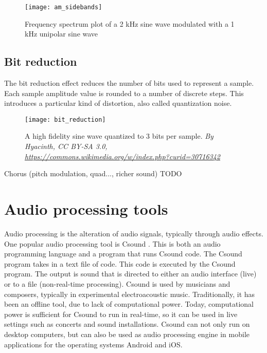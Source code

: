 \begin{figure}[h]
    \centering
    \texttt{[image: am\_sidebands]}
    \caption{Frequency spectrum plot of a 2 kHz sine wave modulated with a 1 kHz unipolar sine wave}
    \label{fig:am_sidebands}
\end{figure}


\subsection{Bit reduction}
The bit reduction effect reduces the number of bits used to represent a sample. Each sample amplitude value is rounded to a number of discrete steps. This introduces a particular kind of distortion, also called quantization noise.

\begin{figure}[h]
    \centering
    \texttt{[image: bit\_reduction]}
    \caption{A high fidelity sine wave quantized to 3 bits per sample. \textit{By Hyacinth, CC BY-SA 3.0, \url{https://commons.wikimedia.org/w/index.php?curid=30716342}}}
    \label{fig:bit_reduction}
\end{figure}

Chorus (pitch modulation, quad..., richer sound) TODO

\section{Audio processing tools}
Audio processing is the alteration of audio signals, typically through audio effects. One popular audio processing tool is Csound \citep{csound}. This is both an audio programming language and a program that runs Csound code. The Csound program takes in a text file of code. This code is executed by the Csound program. The output is sound that is directed to either an audio interface (live) or to a file (non-real-time processing). Csound is used by musicians and composers, typically in experimental electroacoustic music. Traditionally, it has been an offline tool, due to lack of computational power. Today, computational power is sufficient for Csound to run in real-time, so it can be used in live settings such as concerts and sound installations. Csound can not only run on desktop computers, but can also be used as audio processing engine in mobile applications for the operating systems Android and iOS.
